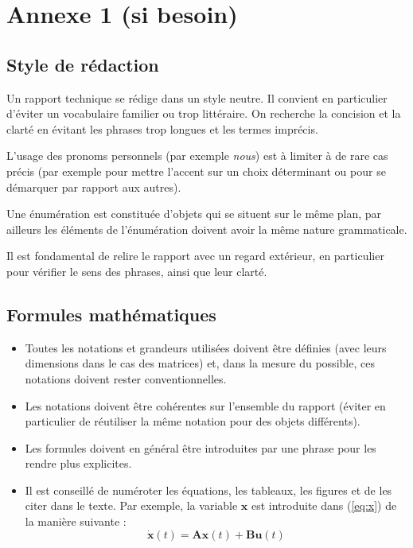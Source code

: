 \chapter*{Annexe 1 (si besoin)}

\makeatletter
\renewcommand{\thesection}{\@arabic\c@section}
\makeatother

\setcounter{section}{0}

\section*{Style de rédaction}
Un rapport technique se rédige dans un style neutre. Il convient en particulier d’éviter un vocabulaire familier ou trop littéraire. On recherche la concision et la clarté en évitant les phrases trop longues et les termes imprécis.

L’usage des pronoms personnels (par exemple \textit{nous}) est à limiter à de rare cas précis (par exemple pour mettre l’accent sur un choix déterminant ou pour se démarquer par rapport aux autres).

Une énumération est constituée d’objets qui se situent sur le même plan, par ailleurs les éléments de l’énumération doivent avoir la même nature grammaticale.

Il est fondamental de relire le rapport avec un regard extérieur, en particulier pour vérifier le sens des phrases, ainsi que leur clarté.


\section*{Formules mathématiques}
\begin{itemize}
	\item Toutes les notations et grandeurs utilisées doivent être définies (avec leurs dimensions dans le cas des matrices) et, dans la mesure du possible, ces notations doivent rester conventionnelles.
	\item Les notations doivent être cohérentes sur l’ensemble du rapport (éviter en particulier de réutiliser la même notation pour des objets différents).
	\item Les formules doivent en général être introduites par une phrase pour les rendre plus explicites.
	\item Il est conseillé de numéroter les équations, les tableaux, les figures et de les citer dans le texte. Par exemple, la variable $\textbf{x}$ est introduite dans (\ref{eq:x}) de la manière suivante : 
	\begin{equation}
	\label{eq:x}
	\dot{\textbf{x}}(t) = \textbf{A} \textbf{x}(t) +\textbf{B} \textbf{u}(t)
	\end{equation}
\end{itemize}

